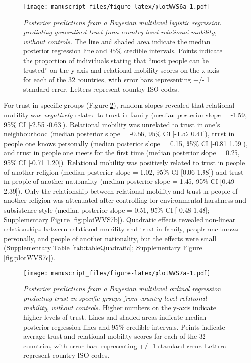\documentclass[
  man,floatsintext]{apa6}
\begin{document}
\begin{figure}
\centering
\texttt{[image: manuscript\_files/figure-latex/plotWVS6a-1.pdf]}
\caption{\label{fig:plotWVS6a}\emph{Posterior predictions from a Bayesian multilevel logistic regression predicting generalised trust from country-level relational mobility, without controls.} The line and shaded area indicate the median posterior regression line and 95\% credible intervals. Points indicate the proportion of individuals stating that ``most people can be trusted'' on the y-axis and relational mobility scores on the x-axis, for each of the 32 countries, with error bars representing +/- 1 standard error. Letters represent country ISO codes.}
\end{figure}

For trust in specific groups (Figure \ref{fig:plotWVS7a}), random slopes revealed that relational mobility was \emph{negatively} related to trust in family (median posterior slope = -1.59, 95\% CI {[}-2.55 -0.63{]}). Relational mobility was unrelated to trust in one's neighbourhood (median posterior slope = -0.56, 95\% CI {[}-1.52 0.41{]}), trust in people one knows personally (median posterior slope = 0.15, 95\% CI {[}-0.81 1.09{]}), and trust in people one meets for the first time (median posterior slope = 0.25, 95\% CI {[}-0.71 1.20{]}). Relational mobility was positively related to trust in people of another religion (median posterior slope = 1.02, 95\% CI {[}0.06 1.98{]}) and trust in people of another nationality (median posterior slope = 1.45, 95\% CI {[}0.49 2.39{]}). Only the relationship between relational mobility and trust in people of another religion was attenuated after controlling for environmental harshness and subsistence style (median posterior slope = 0.51, 95\% CI {[}-0.48 1.48{]}; Supplementary Figure \ref{fig:plotWVS7b}). Quadratic effects revealed non-linear relationships between relational mobility and trust in family, people one knows personally, and people of another nationality, but the effects were small (Supplementary Table \ref{tab:tableQuadratic}; Supplementary Figure \ref{fig:plotWVS7c}).



\begin{figure}
\centering
\texttt{[image: manuscript\_files/figure-latex/plotWVS7a-1.pdf]}
\caption{\label{fig:plotWVS7a}\emph{Posterior predictions from a Bayesian multilevel ordinal regression predicting trust in specific groups from country-level relational mobility, without controls.} Higher numbers on the y-axis indicate higher levels of trust. Lines and shaded areas indicate median posterior regression lines and 95\% credible intervals. Points indicate average trust and relational mobility scores for each of the 32 countries, with error bars representing +/- 1 standard error. Letters represent country ISO codes.}
\end{figure}
\end{document}
